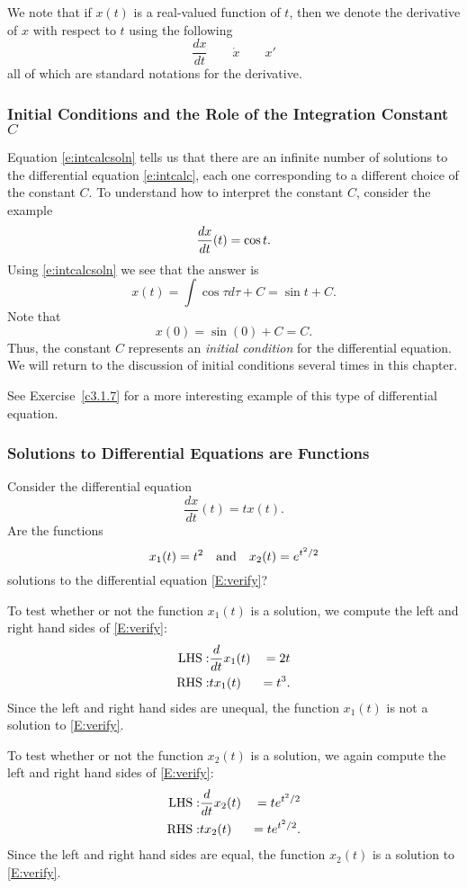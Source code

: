 \documentclass{ximera}
\begin{document}
We note that if $x(t)$ is a real-valued function of $t$, then we denote the 
derivative of $x$ with respect to $t$ using the following
\[
\frac{dx}{dt}\qquad \dot{x} \qquad x'
\]
all of which are standard notations for the derivative.


\subsubsection*{Initial Conditions and the Role of the Integration Constant 
$C$}

Equation \eqref{e:intcalcsoln} tells us that there are an infinite number of
solutions to the differential equation \eqref{e:intcalc}, each one
corresponding to a different choice of the constant $C$.  To understand how
to interpret the constant $C$, consider the example
\[
\displaystyle\frac{dx}{dt}(t) = \cos t.
\]
Using \eqref{e:intcalcsoln} we see that the answer is
\[
x(t) = \int \cos\tau d\tau  + C = \sin t + C.
\]
Note that 
\[
x(0) = \sin(0) + C = C.
\]
Thus, the constant $C$ represents an {\em initial condition\/} for the  
differential equation.  We will return to the discussion of initial 
conditions several times in this chapter.

See Exercise~\ref{c3.1.7} for a more interesting example of this type of
differential equation.

\subsubsection*{Solutions to Differential Equations are Functions}

Consider the differential equation 
\begin{equation} \label{E:verify}
\frac{dx}{dt}(t) = tx(t).
\end{equation}
Are the functions
\[
x_1(t) = t^2 \quad\mbox{and}\quad x_2(t) = e^{t^2/2}
\]
solutions to the differential equation \eqref{E:verify}?

To test whether or not the function $x_1(t)$ is a solution, we compute
the left and right hand sides of \eqref{E:verify}:
\begin{eqnarray*}
{\rm LHS:} & \frac{d}{dt}x_1(t) & = 2t\\
{\rm RHS:} &  tx_1(t) & = t^3.
\end{eqnarray*}
Since the left and right hand sides are unequal, the function $x_1(t)$
is not a solution to \eqref{E:verify}.

To test whether or not the function $x_2(t)$ is a solution, we again
compute the left and right hand sides of \eqref{E:verify}:
\begin{eqnarray*}
{\rm LHS:} & \frac{d}{dt}x_2(t) & = te^{t^2/2}\\
{\rm RHS:} &  tx_2(t) & = te^{t^2/2}.
\end{eqnarray*}
Since the left and right hand sides are equal, the function $x_2(t)$
is a solution to \eqref{E:verify}.
\end{document}
